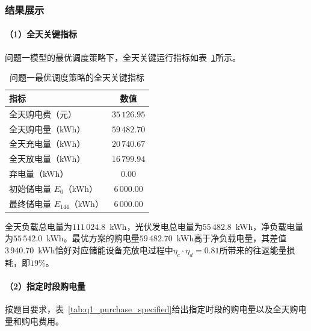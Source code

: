 \documentclass[12pt,a4paper]{ctexart}
\theoremstyle{definition}
\theoremstyle{plain}
\theoremstyle{remark}
\begin{document}
\subsubsection{结果展示}

\paragraph{（1）全天关键指标}

问题一模型的最优调度策略下，全天关键运行指标如表~\ref{tab:q1_summary}所示。

\begin{table}[H]
\centering
\caption{问题一最优调度策略的全天关键指标}
\label{tab:q1_summary}
\begin{tabular}{lc}
\toprule
\textbf{指标} & \textbf{数值} \\
\midrule
全天购电费（元）             & $35\,126.95$ \\
全天购电量（kWh）            & $59\,482.70$ \\
全天充电量（kWh）            & $20\,740.67$ \\
全天放电量（kWh）            & $16\,799.94$ \\
弃电量（kWh）                & $0.00$ \\
初始储电量 $E_0$（kWh）      & $6\,000.00$ \\
最终储电量 $E_{144}$（kWh）  & $6\,000.00$ \\
\bottomrule
\end{tabular}
\end{table}

全天负载总电量为$111\,024.8$~kWh，光伏发电总电量为$55\,482.8$~kWh，净负载电量为$55\,542.0$~kWh。最优方案的购电量$59\,482.70$~kWh高于净负载电量，其差值$3\,940.70$~kWh恰好对应储能设备充放电过程中$\eta_c \cdot \eta_d = 0.81$所带来的往返能量损耗，即$19\%$。

\paragraph{（2）指定时段购电量}

按题目要求，表~\ref{tab:q1_purchase_specified}给出指定时段的购电量以及全天购电量和购电费用。
\end{document}
